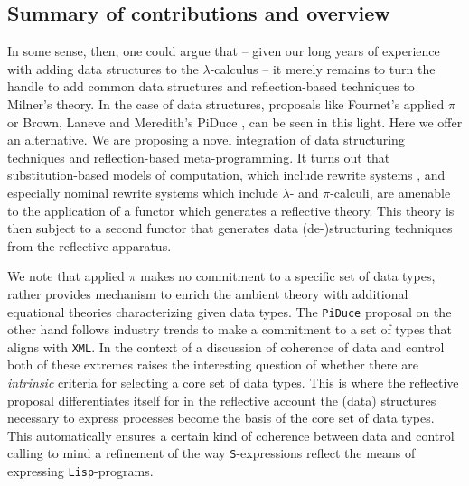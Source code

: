 \subsection{Summary of contributions and overview}

In some sense, then, one could argue that -- given our long years of
experience with adding data structures to the $\lambda$-calculus -- it
merely remains to turn the handle to add common data structures and
reflection-based techniques to Milner's theory. In the case of data
structures, proposals like Fournet's applied $\pi$ \cite{} or Brown,
Laneve and Meredith's PiDuce \cite{}, can be seen in this light. Here
we offer an alternative. We are proposing a novel integration of data
structuring techniques and reflection-based meta-programming. It turns
out that substitution-based models of computation, which include
rewrite systems \cite{}, and especially nominal rewrite systems
\cite{} which include $\lambda$- and $\pi$-calculi, are amenable to
the application of a functor which generates a reflective theory. This
theory is then subject to a second functor that generates data
(de-)structuring techniques from the reflective apparatus.

We note that applied $\pi$ makes no commitment to a specific set of
data types, rather provides mechanism to enrich the ambient theory
with additional equational theories characterizing given data
types. The \texttt{PiDuce} proposal on the other hand follows industry
trends to make a commitment to a set of types that aligns with
\texttt{XML}. In the context of a discussion of coherence of data and
control both of these extremes raises the interesting question of
whether there are \emph{intrinsic} criteria for selecting a core set
of data types. This is where the reflective proposal differentiates
itself for in the reflective account the (data) structures necessary
to express processes become the basis of the core set of data
types. This automatically ensures a certain kind of coherence between
data and control calling to mind a refinement of the way
\texttt{S}-expressions reflect the means of expressing
\texttt{Lisp}-programs.

